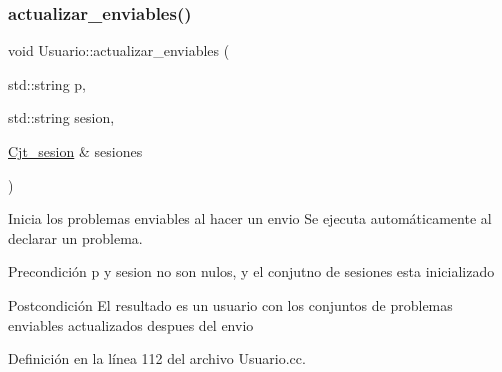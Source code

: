\subsubsection{\texorpdfstring{actualizar\+\_\+enviables()}{actualizar\_enviables()}}
{\footnotesize\ttfamily void Usuario\+::actualizar\+\_\+enviables (\begin{DoxyParamCaption}\item[{std\+::string}]{p,  }\item[{std\+::string}]{sesion,  }\item[{\mbox{\hyperlink{class_cjt__sesion}{Cjt\+\_\+sesion}} \&}]{sesiones }\end{DoxyParamCaption})\hspace{0.3cm}{\ttfamily [private]}}



Inicia los problemas enviables al hacer un envio Se ejecuta automáticamente al declarar un problema. 

\begin{DoxyPrecond}{Precondición}
p y sesion no son nulos, y el conjutno de sesiones esta inicializado 
\end{DoxyPrecond}
\begin{DoxyPostcond}{Postcondición}
El resultado es un usuario con los conjuntos de problemas enviables actualizados despues del envio 
\end{DoxyPostcond}


Definición en la línea 112 del archivo Usuario.\+cc.


